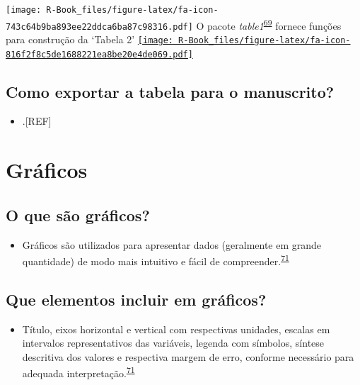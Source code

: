 \documentclass[
]{book}
\providecommand{\tightlist}{%
  \setlength{\itemsep}{0pt}\setlength{\parskip}{0pt}}
\begin{document}
\texttt{[image: R-Book\_files/figure-latex/fa-icon-743c64b9ba893ee22ddca6ba87c98316.pdf]} O pacote \emph{table1}\textsuperscript{\protect\hyperlink{ref-table1}{69}} fornece funções para construção da `Tabela 2' \href{https://cran.r-project.org/web/packages/table1/index.html}{\texttt{[image: R-Book\_files/figure-latex/fa-icon-816f2f8c5de1688221ea8be20e4de069.pdf]}}

\hypertarget{como-exportar-a-tabela-para-o-manuscrito}{%
\subsection{Como exportar a tabela para o manuscrito?}\label{como-exportar-a-tabela-para-o-manuscrito}}

\begin{itemize}
\tightlist
\item
  .{[}REF{]}
\end{itemize}

\hypertarget{graficos}{%
\section{Gráficos}\label{graficos}}

\hypertarget{o-que-suxe3o-gruxe1ficos}{%
\subsection{O que são gráficos?}\label{o-que-suxe3o-gruxe1ficos}}

\begin{itemize}
\tightlist
\item
  Gráficos são utilizados para apresentar dados (geralmente em grande quantidade) de modo mais intuitivo e fácil de compreender.\textsuperscript{\protect\hyperlink{ref-Park2022}{71}}
\end{itemize}

\hypertarget{que-elementos-incluir-em-gruxe1ficos}{%
\subsection{Que elementos incluir em gráficos?}\label{que-elementos-incluir-em-gruxe1ficos}}

\begin{itemize}
\tightlist
\item
  Título, eixos horizontal e vertical com respectivas unidades, escalas em intervalos representativos das variáveis, legenda com símbolos, síntese descritiva dos valores e respectiva margem de erro, conforme necessário para adequada interpretação.\textsuperscript{\protect\hyperlink{ref-Park2022}{71}}
\end{itemize}
\end{document}
